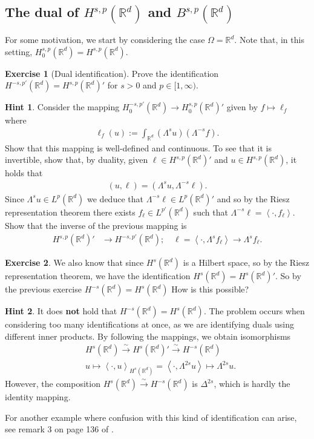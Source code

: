 \documentclass[
    a4paper,
    DIV=14,
    abstract=true,
    numbers=noenddot
]
{scrartcl}
\theoremstyle{definition}
\newtheorem{exercise}{Exercise}
\newtheorem*{hint}{Hint}
\newcommand{\br}[1]{\left\langle#1\right\rangle}
\newcommand{\iso}{\xrightarrow{\sim}}
\newcommand{\R}{\mathbb{R}}
\begin{document}
\subsection{The dual of $H^{s,p}(\R^d)$ and $B^{s,p}(\R^d)$}
For some motivation, we start by considering the case $\Omega =\R^d$. Note that, in this setting, $H_0^{s,p}(\R^d)=H^{s,p}(\R^d)$.
\begin{exercise}[Dual identification]\label{dual exercise}
    Prove the identification $H^{-s,p'}(\R^d)=H^{s,p}(\R^d)'$ for $s>0$ and $p \in [1,\infty)$.
\end{exercise}
\begin{hint}

    Consider the mapping  $H_0^{-s,p'}(\R^d) \to H^{s,p}_0(\R^d)'$ given by $f \mapsto \ell_f$ where
    \begin{align*}
        \ell_f(u):= \int_{\R^d}(\Lambda^s u)(\Lambda ^{-s}f).
    \end{align*}
    Show that this mapping is well-defined and continuous. To see that it is invertible, show that, by duality, given $\ell \in H^{s,p}(\R^d)'$ and $u \in H^{s,p}(\R^d)$, it holds that
    \begin{align*}
        (u,\ell )=(\Lambda ^s u,\Lambda ^{-s}\ell ).
    \end{align*}
    Since $ \Lambda ^s u \in L^p(\R^d)$ we deduce that $\Lambda ^{-s}\ell \in L^{p}(\R^d)'$ and so by the Riesz representation theorem there exists $f_\ell \in L^{p'}(\R^d)$ such that $\Lambda ^{-s}\ell =\br{\cdot,f_\ell}$. Show that the inverse of the previous mapping is
    \begin{align*}
        H^{s,p}(\R^d)'                & \longrightarrow H^{-s,p'}(\R^d); \quad \ell = \br{\cdot, \Lambda^s  f_\ell} \to \Lambda^s  f_\ell.\end{align*}
\end{hint}
\begin{exercise}
    We also know that since $H^{s}(\R^d)$ is a Hilbert space, so by the Riesz representation theorem, we have the identification $H^s(\R^d) = H^{s}(\R^d)'$. So by the previous exercise $H^{-s}(\R^d)= H^s(\R^d)$ How is this possible?
\end{exercise}
\begin{hint}
    It does \textbf{not} hold that $H^{-s}(\R^d)= H^s(\R^d)$. The problem occurs when considering too many identifications at once, as we are identifying duals using different inner products. By following the mappings, we obtain isomorphisms
    \begin{align*}
         & H^{s}(\R^d) \iso   H^s(\R^d)' \iso H^{-s}(\R^d)                                                 \\
         & u \longmapsto   \br{\cdot, u}_{H^s(\R^d)}= \br{\cdot, \Lambda^{2s} u } \mapsto \Lambda ^{2s} u.
    \end{align*}
    However, the composition $H^s(\R^d) \iso H^{-s}(\R^d)$  is $\Delta ^{2s}$, which is hardly the identity mapping.
\end{hint}
For another example where confusion with this kind of identification can arise, see remark 3 on page  136 of \cite{brezis2011functional}.
\end{document}
